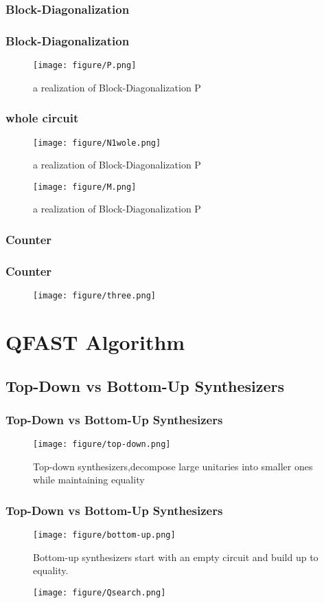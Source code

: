 \documentclass[aspectratio=1610]{beamer}
\begin{document}
\subsubsection{Block-Diagonalization}
\begin{frame}
\frametitle{Block-Diagonalization}
\begin{figure}
  \texttt{[image: figure/P.png]}
  \caption{a realization of Block-Diagonalization P}
\end{figure}
\end{frame}
\begin{frame}
  \frametitle{whole circuit}
  \begin{figure}
    \texttt{[image: figure/N1wole.png]}
    \caption{a realization of Block-Diagonalization P}
  \end{figure}
  \begin{figure}
    \texttt{[image: figure/M.png]}
    \caption{a realization of Block-Diagonalization P}
  \end{figure}
\end{frame}
\subsubsection{Counter}
\begin{frame}
\frametitle{Counter}
  \begin{figure}
    \texttt{[image: figure/three.png]}
  \end{figure}

\end{frame}

\section{QFAST Algorithm}

\subsection{Top-Down vs Bottom-Up Synthesizers}
\begin{frame}
\frametitle{Top-Down vs Bottom-Up Synthesizers}
\begin{figure}
  \texttt{[image: figure/top-down.png]}
  \caption{Top-down synthesizers,decompose large unitaries into smaller ones while maintaining equality}
\end{figure}
\end{frame}
\begin{frame}
  \frametitle{Top-Down vs Bottom-Up Synthesizers}
  \begin{figure}
    \texttt{[image: figure/bottom-up.png]}
    \caption{Bottom-up synthesizers start with an empty circuit and build up to equality.}
  \end{figure}
  \begin{figure}
    \texttt{[image: figure/Qsearch.png]}
    \caption{}
  \end{figure}
\end{frame}
\end{document}
